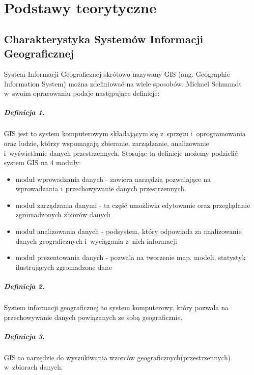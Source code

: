 \documentclass[printmode]{mgr}
\begin{document}
\chapter{Podstawy teorytyczne}

\section{Charakterystyka Systemów Informacji Geograficznej}
System Informacji Geograficznej skrótowo nazywany GIS (ang. Geographic Information System) można zdefiniować na wiele sposobów. Michael Schmandt w~swoim opracowaniu\cite{gis_introduction} podaje następujące definicje:

\paragraph*{Definicja 1.}
GIS jest to system komputerowym składającym się z~sprzętu i~oprogramowania oraz ludzie, którzy wspomagają zbieranie, zarządzanie, analizowanie i~wyświetlanie danych przestrzennych. Stosując tą definicje możemy podzielić system GIS na 4 moduły:

  \begin{itemize}
    \item moduł wprowadzania danych - zawiera narzędzia pozwalające na wprowadzania i~przechowywanie danych przestrzennych.
    \item moduł zarządzania danymi - ta część umożliwia edytowanie oraz przeglądanie zgromadzonych zbiorów danych
    \item moduł analizowania danych - podsystem, który odpowiada za analizowanie danych geograficznych i~wyciągania z~nich informacji
    \item moduł prezentowania danych - pozwala na tworzenie map, modeli, statystyk ilustrujących zgromadzone dane
  \end{itemize}

\paragraph*{Definicja 2.}
System informacji geograficznej to system komputerowy, który pozwala na przechowywanie danych powiązanych ze sobą geograficznie.

\paragraph*{Definicja 3.}
GIS to narzędzie do wyszukiwania wzorców geograficznych(przestrzennych) w~zbiorach danych.
\end{document}
